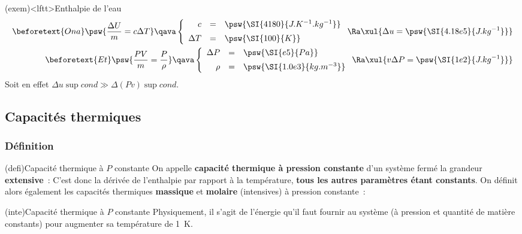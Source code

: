 \documentclass[../../main/main.tex]{subfiles}
\begin{document}
\begin{tcb}(exem)<lftt>{Enthalpie de l'eau}
	\begin{align*}
		\beforetext{On a}
		\psw{\frac{\Delta{U}}{m} = c\Delta{T}}
		\qava
		\left\{
		\begin{array}{rcl}
			c         & = & \psw{\SI{4180}{J.K^{-1}.kg^{-1}}}
			\\[.5em]
			\Delta{T} & = & \psw{\SI{100}{K}}
		\end{array}
		\right.
		\Ra
		\xul{
			\Delta{u} = \psw{\SI{4.18e5}{J.kg^{-1}}}
		}
		\\\beforetext{Et}
		\psw{\frac{PV}{m} = \frac{P}{\rho}}
		\qava
		\left\{
		\begin{array}{rcl}
			\Delta{P} & = & \psw{\SI{e5}{Pa}}
			\\[.5em]
			\rho      & = & \psw{\SI{1.0e3}{kg.m^{-3}}}
		\end{array}
		\right.
		\Ra
		\xul{
			v\Delta{P} = \psw{\SI{1e2}{J.kg^{-1}}}
		}
	\end{align*}
	Soit en effet $\Delta{u}\sup{cond} \gg \Delta{(Pv)}\sup{cond}$.
\end{tcb}

\subsection{Capacités thermiques}

\subsubsection{Définition}

\begin{tcb*}[label=defi:cp, sidebyside](defi){Capacité thermique à $P$ constante}
	On appelle \textbf{capacité thermique à pression constante} d'un système fermé la
	grandeur \textbf{extensive}~:
	\psw{%
		\[
			\boxed{C_P = \pdv{H}{T}}
		\]
	}%
	C'est donc la dérivée de l'enthalpie par rapport à la température,
	\textbf{tous les autres paramètres étant constants}.
	\tcblower
	On définit alors également les capacités thermiques \textbf{massique} et
	\textbf{molaire} (intensives) à pression constante~:
	\psw{%
		\[
			c_P = \frac{C_P}{m}
			\qqet
			C_{P,m} = \frac{C_P}{n}
		\]
	}%
\end{tcb*}

\begin{tcb}(inte){Capacité thermique à $P$ constante}
	Physiquement, il s’agit de l’énergie qu’il faut fournir au système (à pression
	et quantité de matière constants) pour augmenter sa température de \SI{1}{K}.
\end{tcb}
\end{document}
